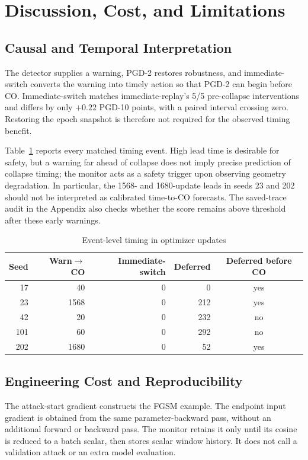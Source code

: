 \section{Discussion, Cost, and Limitations}
\subsection{Causal and Temporal Interpretation}
The detector supplies a warning, PGD-2 restores robustness, and
immediate-switch converts the warning into
timely action so that PGD-2 can begin before CO. Immediate-switch matches
immediate-replay's 5/5 pre-collapse interventions and differs by only $+0.22$ PGD-10
points, with a paired interval crossing zero. Restoring the epoch snapshot is
therefore not required for the observed timing benefit.

Table~\ref{tab:event-audit} reports every matched timing event. High lead time
is desirable for safety, but a warning far ahead of collapse does not imply
precise prediction of collapse timing; the monitor acts as a safety trigger
upon observing geometry degradation. In particular, the 1568- and 1680-update
leads in seeds 23 and 202 should not be interpreted as calibrated time-to-CO
forecasts. The saved-trace audit in the Appendix also checks whether the score
remains above threshold after these early warnings.

\begin{table}[t]
\centering
\caption{Event-level timing in optimizer updates}
\label{tab:event-audit}
\scriptsize
\setlength{\tabcolsep}{3pt}
\begin{tabular}{rrrrc}
\toprule
Seed & Warn$\to$CO & Immediate-switch & Deferred & Deferred before CO \\
\midrule
17  & 40   & 0 & 0   & yes \\
23  & 1568 & 0 & 212 & yes \\
42  & 20   & 0 & 232 & no \\
101 & 60   & 0 & 292 & no \\
202 & 1680 & 0 & 52  & yes \\
\bottomrule
\end{tabular}
\end{table}

\subsection{Engineering Cost and Reproducibility}
The attack-start gradient constructs the FGSM example. The endpoint input
gradient is obtained from the same parameter-backward pass, without an
additional forward or backward pass. The monitor retains it only until its
cosine is reduced to a batch scalar, then stores scalar window history. It does
not call a validation attack or an extra model evaluation.

